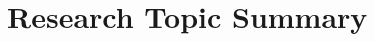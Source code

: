 \documentclass[a4paper,oneside,12pt]{book}
\numberwithin{equation}{chapter} %
\begin{document}
\tableofcontents
\newpage





\mainmatter

\chapter{Research Topic Summary}
\end{document}
